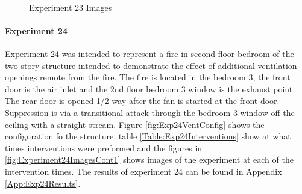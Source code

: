 \documentclass{article}
\begin{document}
\begin{figure}[H]
	\ContinuedFloat 
	\centering 
	 \ 
	\caption{Experiment 23 Images}
	\label{fig:Experiment23ImagesCont3} 
\end{figure}

\paragraph{Experiment 24}\mbox{}

Experiment 24 was intended to represent a fire in second floor bedroom of the two story structure intended to demonstrate the effect of additional ventilation openings remote from the fire. The fire is located in the bedroom 3, the front door is the air inlet and the 2nd floor bedroom 3 window is the exhaust point. The rear door is opened 1/2 way after the fan is started at the front door. Suppression is via a transitional attack through the bedroom 3 window off the ceiling with a straight stream. Figure \ref{fig:Exp24VentConfig} shows the configuration fo the structure, table \ref{Table:Exp24Interventions} show at what times interventions were preformed and the figures in \ref{fig:Experiment24ImagesCont1} shows images of the experiment at each of the intervention times. The results of experiment 24 can be found in Appendix \ref{App:Exp24Results}.
\end{document}
